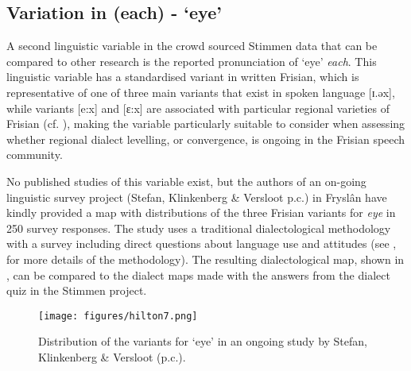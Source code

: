 \documentclass[output=paper,hidelinks]{langscibook}
\begin{document}
\subsection{Variation in (each) - ‘eye’}

A second linguistic variable in the crowd sourced Stimmen data that can be compared to other research is the reported pronunciation of ‘eye’ \textit{each}. This linguistic variable has a standardised variant in written Frisian, which is representative of one of three main variants that exist in spoken language [ɪ.əx], while variants [e:x] and [ɛ:x] are associated with particular regional varieties of Frisian (cf. \citealt[19]{breuker1992taalkundige}), making the variable particularly suitable to consider when assessing whether regional dialect levelling, or convergence, is ongoing in the Frisian speech community. 

No published studies of this variable exist, but the authors of an on-going linguistic survey project (Stefan, Klinkenberg \& Versloot p.c.) in Fryslân have kindly provided a map with distributions of the three Frisian variants for \textit{eye} in 250 survey responses. The study uses a traditional dialectological methodology with a survey including direct questions about language use and attitudes (see \citeauthor{stefan2014frisian}, \citeyear{stefan2014frisian} for more details of the methodology). The resulting dialectological map, shown in , can be compared to the dialect maps made with the answers from the dialect quiz in the Stimmen project.



\begin{figure}
  \texttt{[image: figures/hilton7.png]}
  \caption{Distribution of the variants for ‘eye’ in an ongoing study by Stefan, Klinkenberg \& Versloot (p.c.).}
 \label{fig:hilton:7}
\end{figure}
\end{document}
